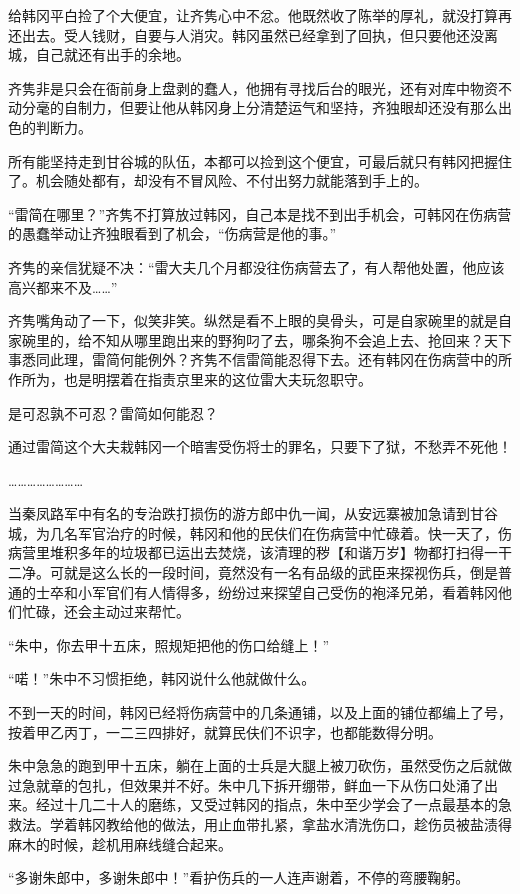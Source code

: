 给韩冈平白捡了个大便宜，让齐隽心中不忿。他既然收了陈举的厚礼，就没打算再还出去。受人钱财，自要与人消灾。韩冈虽然已经拿到了回执，但只要他还没离城，自己就还有出手的余地。

齐隽非是只会在衙前身上盘剥的蠢人，他拥有寻找后台的眼光，还有对库中物资不动分毫的自制力，但要让他从韩冈身上分清楚运气和坚持，齐独眼却还没有那么出色的判断力。

所有能坚持走到甘谷城的队伍，本都可以捡到这个便宜，可最后就只有韩冈把握住了。机会随处都有，却没有不冒风险、不付出努力就能落到手上的。

“雷简在哪里？”齐隽不打算放过韩冈，自己本是找不到出手机会，可韩冈在伤病营的愚蠢举动让齐独眼看到了机会，“伤病营是他的事。”

齐隽的亲信犹疑不决：“雷大夫几个月都没往伤病营去了，有人帮他处置，他应该高兴都来不及……”

齐隽嘴角动了一下，似笑非笑。纵然是看不上眼的臭骨头，可是自家碗里的就是自家碗里的，给不知从哪里跑出来的野狗叼了去，哪条狗不会追上去、抢回来？天下事悉同此理，雷简何能例外？齐隽不信雷简能忍得下去。还有韩冈在伤病营中的所作所为，也是明摆着在指责京里来的这位雷大夫玩忽职守。

是可忍孰不可忍？雷简如何能忍？

通过雷简这个大夫栽韩冈一个暗害受伤将士的罪名，只要下了狱，不愁弄不死他！

……………………

当秦凤路军中有名的专治跌打损伤的游方郎中仇一闻，从安远寨被加急请到甘谷城，为几名军官治疗的时候，韩冈和他的民伕们在伤病营中忙碌着。快一天了，伤病营里堆积多年的垃圾都已运出去焚烧，该清理的秽【和谐万岁】物都打扫得一干二净。可就是这么长的一段时间，竟然没有一名有品级的武臣来探视伤兵，倒是普通的士卒和小军官们有人情得多，纷纷过来探望自己受伤的袍泽兄弟，看着韩冈他们忙碌，还会主动过来帮忙。

“朱中，你去甲十五床，照规矩把他的伤口给缝上！”

“喏！”朱中不习惯拒绝，韩冈说什么他就做什么。

不到一天的时间，韩冈已经将伤病营中的几条通铺，以及上面的铺位都编上了号，按着甲乙丙丁，一二三四排好，就算民伕们不识字，也都能数得分明。

朱中急急的跑到甲十五床，躺在上面的士兵是大腿上被刀砍伤，虽然受伤之后就做过急就章的包扎，但效果并不好。朱中几下拆开绷带，鲜血一下从伤口处涌了出来。经过十几二十人的磨练，又受过韩冈的指点，朱中至少学会了一点最基本的急救法。学着韩冈教给他的做法，用止血带扎紧，拿盐水清洗伤口，趁伤员被盐渍得麻木的时候，趁机用麻线缝合起来。

“多谢朱郎中，多谢朱郎中！”看护伤兵的一人连声谢着，不停的弯腰鞠躬。

